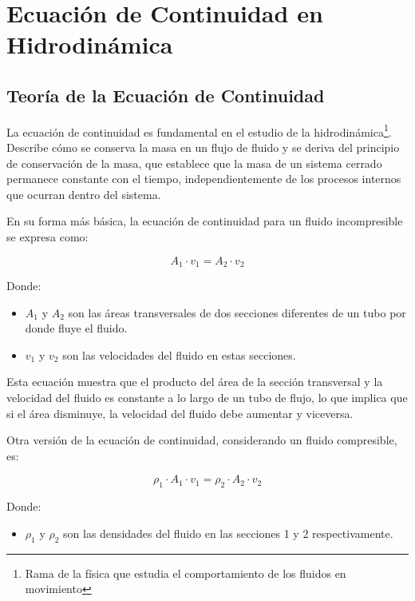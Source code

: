 \documentclass[../main]{subfiles}
\begin{document}
\chapter{Ecuación de Continuidad en Hidrodinámica}

\section{Teoría de la Ecuación de Continuidad}

La ecuación de continuidad es fundamental en el estudio de la hidrodinámica\footnote{Rama de la física que estudia el comportamiento de los fluidos en movimiento}. Describe cómo se conserva la masa en un flujo de fluido y se deriva del principio de conservación de la masa, que establece que la masa de un sistema cerrado permanece constante con el tiempo, independientemente de los procesos internos que ocurran dentro del sistema.

En su forma más básica, la ecuación de continuidad para un fluido incompresible se expresa como:

\begin{equation}
A_1 \cdot v_1 = A_2 \cdot v_2
\end{equation}

Donde:
\begin{itemize}
    \item $A_1$ y $A_2$ son las áreas transversales de dos secciones diferentes de un tubo por donde fluye el fluido.
    \item $v_1$ y $v_2$ son las velocidades del fluido en estas secciones.
\end{itemize}

Esta ecuación muestra que el producto del área de la sección transversal y la velocidad del fluido es constante a lo largo de un tubo de flujo, lo que implica que si el área disminuye, la velocidad del fluido debe aumentar y viceversa.

Otra versión de la ecuación de continuidad, considerando un fluido compresible, es:

\begin{equation}
\rho_1 \cdot A_1 \cdot v_1 = \rho_2 \cdot A_2 \cdot v_2
\end{equation}

Donde:
\begin{itemize}
    \item $\rho_1$ y $\rho_2$ son las densidades del fluido en las secciones 1 y 2 respectivamente.
\end{itemize}
\end{document}
